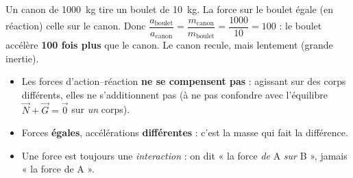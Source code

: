 \documentclass[11pt,a4paper]{article}
\newcommand{\vv}[1]{\vec{#1}}\newcommand{\ds}{\displaystyle}
\begin{document}
\begin{exemplebox}
Un canon de \qty{1000}{\kilogram} tire un boulet de \qty{10}{\kilogram}. La force sur le boulet égale
(en réaction) celle sur le canon. Donc
$\dfrac{a_{\text{boulet}}}{a_{\text{canon}}}=\dfrac{m_{\text{canon}}}{m_{\text{boulet}}}=\dfrac{1000}{10}=100$ :
le boulet accélère \textbf{100 fois plus} que le canon. Le canon recule, mais lentement (grande inertie).
\end{exemplebox}

\begin{piege}
\begin{itemize}[leftmargin=1.4em,topsep=2pt,itemsep=1.5pt]
  \item Les forces d'action--réaction \textbf{ne se compensent pas} : agissant sur des corps différents,
        elles ne s'additionnent pas (à ne pas confondre avec l'équilibre $\vv N+\vv G=\vv 0$ sur \emph{un} corps).
  \item Forces \textbf{égales}, accélérations \textbf{différentes} : c'est la masse qui fait la différence.
  \item Une force est toujours une \emph{interaction} : on dit « la force \emph{de} A \emph{sur} B », jamais « la force de A ».
\end{itemize}
\end{piege}
\end{document}
